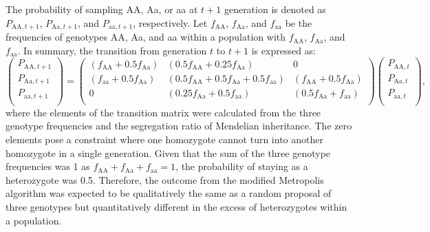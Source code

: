 \documentclass[12pt,]{article}
\begin{document}
The probability of sampling AA, Aa, or aa at $t+1$ generation is denoted as $P_{\mathrm{AA},t+1}$, $P_{\mathrm{Aa},t+1}$, and $P_{\mathrm{aa},t+1}$, respectively. Let $f_\mathrm{AA}$, $f_\mathrm{Aa}$, and $f_\mathrm{aa}$ be the frequencies of genotypes AA, Aa, and aa within a population with $f_\mathrm{AA}$, $f_\mathrm{Aa}$, and $f_\mathrm{aa}$. In summary, the transition from generation $t$ to $t+1$ is expressed as:
$$
\left( \begin{array}{cc} 
    P_{\mathrm{AA},t+1}\\ 
    P_{\mathrm{Aa},t+1}\\
    P_{\mathrm{aa},t+1}\\
    \end{array} \right) 
    =
\left(\begin{array}{ccc}
    (f_\mathrm{AA}+0.5f_\mathrm{Aa}) & (0.5f_\mathrm{AA}+0.25f_\mathrm{Aa}) & 0\\ 
    (f_\mathrm{aa}+0.5f_\mathrm{Aa}) & (0.5f_\mathrm{AA}+0.5f_\mathrm{Aa}+0.5f_\mathrm{aa}) & (f_\mathrm{AA}+0.5f_\mathrm{Aa})\\
    0 & (0.25f_\mathrm{Aa}+0.5f_\mathrm{aa}) & (0.5f_\mathrm{Aa}+f_\mathrm{aa})\\
    \end{array} \right) 
\left( \begin{array}{cc} 
    P_{\mathrm{AA},t}\\ 
    P_{\mathrm{Aa},t}\\
    P_{\mathrm{aa},t}\\
    \end{array} \right),
$$
\noindent
where the elements of the transition matrix were calculated from the three genotype frequencies and the segregation ratio of Mendelian inheritance. The zero elements pose a constraint where one homozygote cannot turn into another homozygote in a single generation. Given that the sum of the three genotype frequencies was 1 as $f_\mathrm{AA}+f_\mathrm{Aa}+f_\mathrm{aa}=1$, the probability of staying as a heterozygote was 0.5. Therefore, the outcome from the modified Metropolis algorithm was expected to be qualitatively the same as a random proposal of three genotypes but quantitatively different in the excess of heterozygotes within a population.
\end{document}
